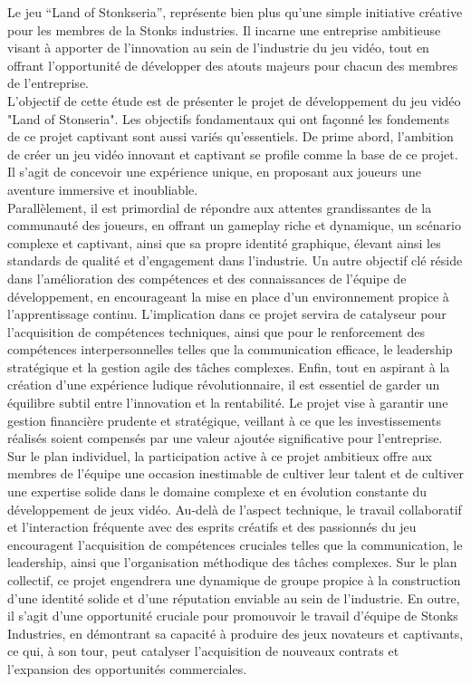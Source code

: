 Le  jeu “Land of Stonkseria”, représente bien plus qu'une simple initiative créative pour les membres de la Stonks industries. 
Il incarne une entreprise ambitieuse visant à apporter de l’innovation au sein de l'industrie du jeu vidéo, 
tout en offrant l'opportunité de développer des atouts majeurs pour chacun des membres de l’entreprise.
\\

L'objectif de cette étude est de présenter le projet de développement du jeu vidéo "Land of Stonseria".
Les objectifs fondamentaux qui ont façonné les fondements de ce projet captivant sont aussi variés qu'essentiels.
De prime abord, l'ambition de créer un jeu vidéo innovant et captivant se profile comme la base de ce projet.
Il s'agit de concevoir une expérience unique, en proposant aux joueurs une aventure immersive et inoubliable.
\\

Parallèlement, il est primordial de répondre aux attentes grandissantes de la communauté des joueurs, en offrant un gameplay riche et dynamique, un scénario complexe et captivant, ainsi que sa propre identité graphique, élevant ainsi les standards de qualité et d'engagement dans l'industrie.
Un autre objectif clé réside dans l'amélioration des compétences et des connaissances de l'équipe de développement, en encourageant la mise en place d’un environnement propice à l'apprentissage continu. 
L'implication dans ce projet servira de catalyseur pour l'acquisition de compétences techniques, ainsi que pour le renforcement des compétences interpersonnelles telles que la communication efficace, le leadership stratégique et la gestion agile des tâches complexes.
Enfin, tout en aspirant à la création d'une expérience ludique révolutionnaire, il est essentiel de garder un équilibre subtil entre l'innovation et la rentabilité. 
Le projet vise à garantir une gestion financière prudente et stratégique, veillant à ce que les investissements réalisés soient compensés par une valeur ajoutée significative pour l'entreprise.
\\

Sur le plan individuel, la participation active à ce projet ambitieux offre aux membres de l'équipe une occasion inestimable de cultiver leur talent et de cultiver une expertise solide dans le domaine complexe et en évolution constante du développement de jeux vidéo. 
Au-delà de l'aspect technique, le travail collaboratif et l'interaction fréquente avec des esprits créatifs et des passionnés du jeu encouragent l'acquisition de compétences cruciales telles que la communication, le leadership, ainsi que l'organisation méthodique des tâches complexes.
Sur le plan collectif, ce projet engendrera une dynamique de groupe propice à la construction d'une identité solide et d'une réputation enviable au sein de l'industrie. 
En outre, il s'agit d'une opportunité cruciale pour promouvoir le travail d'équipe de Stonks Industries, en démontrant sa capacité à produire des jeux novateurs et captivants, ce qui, à son tour, peut catalyser l'acquisition de nouveaux contrats et l'expansion des opportunités commerciales.
\\

